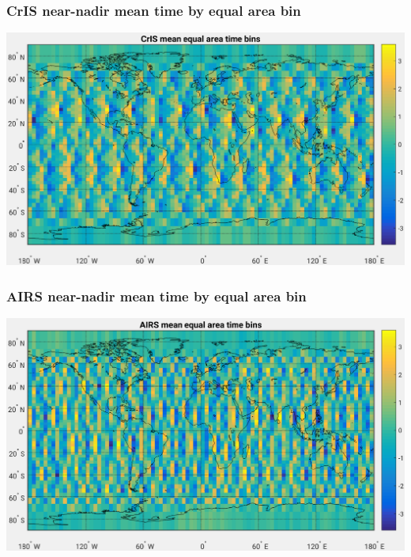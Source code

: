 \documentclass[11pt]{beamer}
\begin{document}
\begin{frame}
\frametitle{CrIS near-nadir mean time by equal area bin}
\begin{center}
  \includegraphics[scale=0.5]{figures/cris_eq_area_rel_time_d1s1w1.pdf}
\end{center}
\end{frame} %
\begin{frame}
\frametitle{AIRS near-nadir mean time by equal area bin}
\begin{center}
  \includegraphics[scale=0.5]{figures/airs_eq_area_rel_time_d1s1w1.pdf}
\end{center}
\end{frame} %
\end{document}
